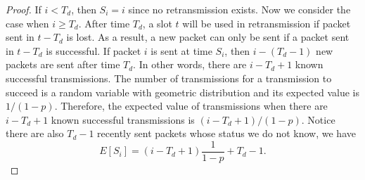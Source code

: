 \begin{proof}
    If $i<T_d$, then $S_i = i$ since no retransmission exists.
    Now we consider the case when $i \geq T_d$.
    After time $T_d$, a slot $t$ will be used in retransmission if packet
    sent in $t - T_d$ is lost. As a result, a new packet can only be sent
    if a packet sent in $t - T_d$ is successful. If packet $i$ is sent 
    at time $S_i$, then $i - (T_d - 1) $ new packets are sent after
    time $T_d$. In other words, there are $i - T_d + 1$ known successful 
    transmissions.
    The number of transmissions for a transmission to succeed
    is a random variable with geometric distribution and its
    expected value is $1/(1-p)$.  Therefore, the expected value of
    transmissions when there are $i - T_d + 1$ known successful 
    transmissions is $(i - T_d +1)/(1-p)$. 
    Notice there are also $T_d - 1$ recently sent packets 
    whose status we do not know, we have 
    \begin{displaymath}
        E[S_i]          = (i - T_d + 1)\frac{1}{1-p} + T_d - 1.
    \end{displaymath}

\end{proof}
